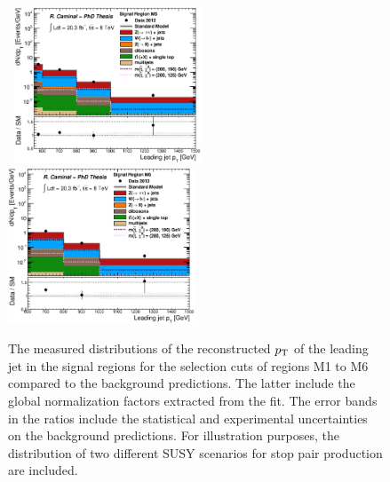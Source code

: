 \begin{figure}[!ht]
\begin{center}
{    }
    \mbox{
      \includegraphics[width=0.495\textwidth]{MonojetAnalysis/Figures/plot_Stop_A9_SR_pt1_fitted.eps}
      \includegraphics[width=0.495\textwidth]{MonojetAnalysis/Figures/plot_Stop_A10_SR_pt1_fitted.eps}
    }
  \end{center}
  \caption[Distributions of the reconstructed $\pt$ of the leading jet in the signal regions for the selection cuts of regions M1 to M6, after the normalization factors extracted from the fit have been applied.]{The measured distributions of the reconstructed $\pt$ of the leading jet in the signal regions for the selection cuts of regions M1 to M6 compared to the background predictions. The latter include the global normalization factors extracted from the fit. The error bands in the ratios include the statistical and experimental uncertainties on the background predictions. For illustration purposes, the distribution of two different SUSY scenarios for stop pair production are included.}
  \label{fig:Plot_M1_SR_pt1}
\end{figure}


